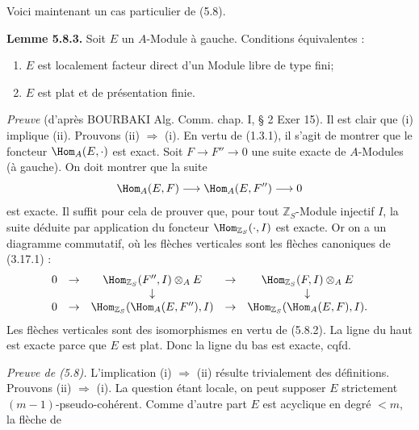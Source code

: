 Voici maintenant un cas particulier de (5.8).

\textbf{Lemme 5.8.3.} Soit \(E\) un \(A\)-Module à gauche. Conditions équivalentes :
\begin{enumerate}[label=(\roman*)]
\item \(E\) est localement facteur direct d'un Module libre de type fini;
\item \(E\) est plat et de présentation finie.
\end{enumerate}

\emph{Preuve} (d'après BOURBAKI Alg. Comm. chap. I, § 2 Exer 15). Il est clair que (i) implique (ii). Prouvons (ii) \(\Rightarrow\) (i). En vertu de (1.3.1), il s'agit de montrer que le foncteur \(\Hom_A(E,\cdot)\) est exact. Soit \(F\longrightarrow F''\longrightarrow 0\) une suite exacte de \(A\)-Modules (à gauche). On doit montrer que la suite
\[
  \Hom_A(E,F)\longrightarrow \Hom_A(E,F'')\longrightarrow 0
\]
est exacte. Il suffit pour cela de prouver que, pour tout \(\mathbb Z_S\)-Module injectif \(I\), la suite déduite par application du foncteur \(\Hom_{\mathbb Z_S}(\cdot,I)\) est exacte. Or on a un diagramme commutatif, où les flèches verticales sont les flèches canoniques de (3.17.1) :
\[
\begin{array}{ccccccccc}
0&\to&\Hom_{\mathbb Z_S}(F'',I)\otimes_A E&\to&\Hom_{\mathbb Z_S}(F,I)\otimes_A E\\
&&\downarrow&&\downarrow\\
0&\to&\Hom_{\mathbb Z_S}(\Hom_A(E,F''),I)&\to&\Hom_{\mathbb Z_S}(\Hom_A(E,F),I).
\end{array}
\]
Les flèches verticales sont des isomorphismes en vertu de (5.8.2). La ligne du haut est exacte parce que \(E\) est plat. Donc la ligne du bas est exacte, cqfd.

\emph{Preuve de (5.8).} L'implication (i) \(\Rightarrow\) (ii) résulte trivialement des définitions. Prouvons (ii) \(\Rightarrow\) (i). La question étant locale, on peut supposer \(E\) strictement \((m-1)\)-pseudo-cohérent. Comme d'autre part \(E\) est acyclique en degré \(<m\), la flèche de
